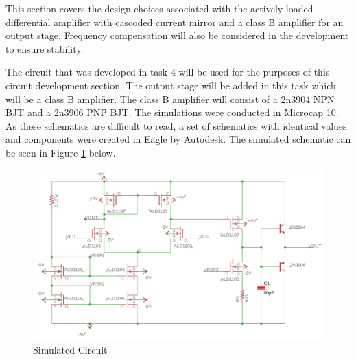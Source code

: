 


This section covers the design choices associated with the actively loaded differential amplifier with cascoded current mirror and a class B amplifier for an output stage. Frequency compensation will also be considered in the development to ensure stability.

The circuit that was developed in task 4 will be used for the purposes of this circuit development section. The output stage will be added in this task which will be a class B amplifier. The class B amplifier will consist of a 2n3904 NPN BJT and a 2n3906 PNP BJT. The simulations were conducted in Microcap 10. As these schematics are difficult to read, a set of schematics with identical values and components were created in Eagle by Autodesk. The simulated schematic can be seen in Figure \ref{fig:simschem} below.

\begin{figure}[H]
	\centering
	\includegraphics[width=0.8\linewidth]{CircuitDevelopment/schematicsimulation.png}
	\caption{Simulated Circuit}
	\label{fig:simschem}
\end{figure}



